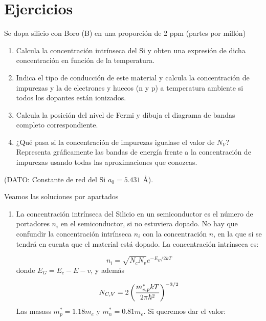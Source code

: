 
\section{Ejercicios}

\tcbstartrecording

\begin{texercise}
	Se dopa silicio con Boro (B) en una proporción de 2 ppm (partes por millón)
	\begin{enumerate}[label=\alph*)]
		\item Calcula la concentración intrínseca del Si y obten una expresión de dicha concentración en función de la temperatura.
		\item Indica el tipo de conducción de este material y calcula la concentración de impurezas y la de electrones y huecos (n y p) a temperatura ambiente si todos los dopantes están ionizados.
		\item Calcula la posición del nivel de Fermi y dibuja el diagrama de bandas completo correspondiente.
		\item ¿Qué pasa si la concentración de impurezas igualase el valor de \( N_V \)? Representa gráficamente las bandas de energía frente a la concentración de impurezas usando todas las aproximaciones que conozcas.
	\end{enumerate}
	(DATO: Constante de red del Si \( a_0 = 5.431 \) Å).

	\tcblower
	Veamos las soluciones por apartados
	\begin{enumerate}[label=\alph*)]
		\item La concentración intrínseca del Silicio en un semiconductor es el número de portadores $n_i$ en el semiconductor, si no estuviera dopado. No hay que confundir la concentración intrínseca $n_i$ con la concentración $n$, en la que si se tendrá en cuenta que el material está dopado. La concentración intrínseca es:
		
		\begin{equation}
			n_i = \sqrt{N_cN_v} e^{-E_G/2kT}
		\end{equation}
		donde $E_G=E_c-E-v$, y además

		\begin{equation}
			N_{C,V} = 2 \left( \frac{m_{e,p}^* kT}{2\pi\hbar^2} \right)^{-3/2}
		\end{equation}
		Las masass $m_p^*= 1.18m_e$ y $m_n^*=0.81m_e$. Si queremos dar el valor:


\end{enumerate}
\end{texercise}
